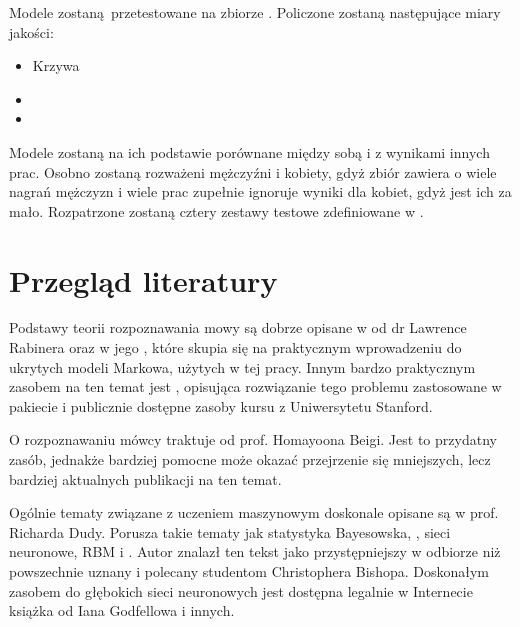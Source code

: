 Modele zostaną przetestowane na zbiorze . Policzone zostaną następujące miary jakości:

\begin{itemize}
    \item Krzywa 
    \item {}
    \item {}
\end{itemize}

Modele zostaną na ich podstawie porównane między sobą i z wynikami innych prac. Osobno zostaną rozważeni mężczyźni
i kobiety, gdyż zbiór zawiera o wiele nagrań mężczyzn i wiele prac zupełnie ignoruje wyniki dla kobiet,
gdyż jest ich za mało. Rozpatrzone zostaną cztery zestawy testowe zdefiniowane w .

\section{Przegląd literatury}\label{sec:przeglad_literatury}

Podstawy teorii rozpoznawania mowy są dobrze opisane w \cite{fundamentalsOfSpeech}
od dr Lawrence Rabinera oraz w jego
\cite{aTutorialOnHidden}, które
skupia się na praktycznym wprowadzeniu do ukrytych modeli Markowa, użytych w tej pracy.
Innym bardzo praktycznym zasobem na ten temat jest \cite{theHtkBook}, opisująca rozwiązanie
tego problemu zastosowane w pakiecie  i publicznie dostępne zasoby
kursu  z Uniwersytetu Stanford.

O rozpoznawaniu mówcy traktuje  od prof. Homayoona Beigi.
Jest to przydatny zasób, jednakże bardziej pomocne może okazać przejrzenie się mniejszych, lecz
bardziej aktualnych publikacji na ten temat.

Ogólnie tematy związane z uczeniem maszynowym doskonale opisane są w
\cite{patternClassification} prof. Richarda Dudy.
Porusza takie tematy jak statystyka Bayesowska, , sieci neuronowe, RBM
i . Autor znalazł ten tekst jako przystępniejszy w odbiorze niż powszechnie
uznany i polecany studentom  Christophera Bishopa.
Doskonałym zasobem do głębokich sieci neuronowych jest dostępna legalnie w Internecie książka
\cite{deeplearningbook} od Iana Godfellowa i innych.

